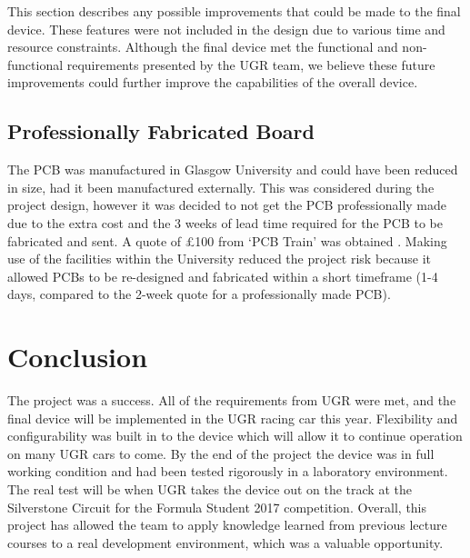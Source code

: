 \documentclass[a4paper,12pt]{article}
\begin{document}
This section describes any possible improvements that could be made to the final device. These features were not included in the design due to various time and resource constraints. Although the final device met the functional and non-functional requirements presented by the UGR team, we believe these future improvements could further improve the capabilities of the overall device.

\subsection{Professionally Fabricated Board}
\label{sec:future_improvement_1}

The PCB was manufactured in Glasgow University and could have been reduced in size, had it been manufactured externally. This was considered during the project design, however it was decided to not get the PCB professionally made due to the extra cost and the 3 weeks of lead time required for the PCB to be fabricated and sent. A quote of £100 from ‘PCB Train’ was obtained \cite{pcb_train}. Making use of the facilities within the University reduced the project risk because it allowed PCBs to be re-designed and fabricated within a short timeframe (1-4 days, compared to the 2-week quote for a professionally made PCB).


\section{Conclusion}
\label{sec:conclusion}

The project was a success. All of the requirements from UGR were met, and the final device will be implemented in the UGR racing car this year. Flexibility and configurability was built in to the device which will allow it to continue operation on many UGR cars to come. By the end of the project the device was in full working condition and had been tested rigorously in a laboratory environment. The real test will be when UGR takes the device out on the track at the Silverstone Circuit for the Formula Student 2017 competition. Overall, this project has allowed the team to apply knowledge learned from previous lecture courses to a real development environment, which was a valuable opportunity.

\end{document}
